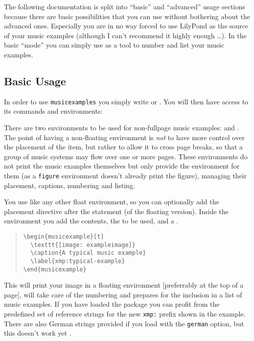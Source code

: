 \documentclass{OLLbook}
\begin{document}
The following documentation is split into “basic” and “advanced” usage sections because there are basic possibilities that you can use without bothering about the advanced ones.
Especially you are in no way forced to use LilyPond as the source of your music examples (although I can't recommend it highly enough \dots).
In the basic “mode” you can simply use  as a tool to number and list your music examples.

\subsection{Basic Usage}
\label{subsec:xmp_basic-usage}
In order to use \texttt{musicexamples} you simply write  or .
You will then have access to its commands and environments:

There are two environments to be used for non-fullpage music examples:  and .
The point of having a non-floating environment is \emph{not} to have more control over the placement of the item, but rather to allow it to cross page breaks, so that a group of music systems may flow over one or more pages. 
These environments do not print the music examples themselves but only provide the environment for them (as a \texttt{figure} environment doesn't already print the figure), managing their placement, captions, numbering and listing.

You use  like any other float environment, so you can optionally add the placement directive after the  statement (of the floating version).
Inside the environment you add the contents, the  to be used, and a .
\begin{quote}
\begin{verbatim}
\begin{musicexample}[t]
  \texttt{[image: exampleimage]}
  \caption{A typical music example}
  \label{xmp:typical-example}
\end{musicexample}
\end{verbatim}
\end{quote}

This will print your image in a floating environment [preferrably at the top of a page], will take care of the numbering and prepares for the inclusion in a list of music examples.
If you have loaded the  package you can profit from the predefined set of reference strings for the new \texttt{xmp:} prefix shown in the example.
There are also German strings provided if you load  with the \texttt{german} option, but this doesn't work yet .
\end{document}
